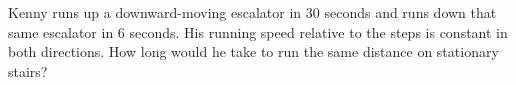 Kenny runs up a downward-moving escalator in $30$ seconds and runs down that same escalator in $6$ seconds. His running speed relative to the steps is constant in both directions. How long would he take to run the same distance on stationary stairs?
